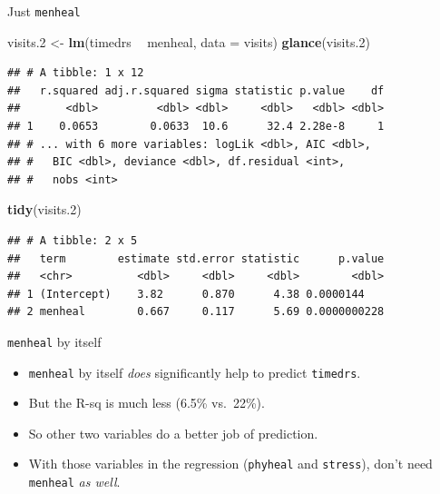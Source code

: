 \documentclass[
  ignorenonframetext,
]{beamer}
\newenvironment{Shaded}{\begin{snugshade}}{\end{snugshade}}
\newcommand{\DataTypeTok}[1]{\textcolor[rgb]{0.13,0.29,0.53}{#1}}
\newcommand{\FloatTok}[1]{\textcolor[rgb]{0.00,0.00,0.81}{#1}}
\newcommand{\KeywordTok}[1]{\textcolor[rgb]{0.13,0.29,0.53}{\textbf{#1}}}
\newcommand{\NormalTok}[1]{#1}
\newcommand{\OperatorTok}[1]{\textcolor[rgb]{0.81,0.36,0.00}{\textbf{#1}}}
\newcommand{\StringTok}[1]{\textcolor[rgb]{0.31,0.60,0.02}{#1}}
\begin{document}
\begin{frame}[fragile]{Just \texttt{menheal}}
\protect\hypertarget{just-menheal}{}

\footnotesize

\begin{Shaded}
\begin{Highlighting}[]
\NormalTok{visits}\FloatTok{.2}\NormalTok{ <-}\StringTok{ }\KeywordTok{lm}\NormalTok{(timedrs }\OperatorTok{~}\StringTok{ }\NormalTok{menheal, }\DataTypeTok{data =}\NormalTok{ visits)}
\KeywordTok{glance}\NormalTok{(visits}\FloatTok{.2}\NormalTok{)}
\end{Highlighting}
\end{Shaded}

\begin{verbatim}
## # A tibble: 1 x 12
##   r.squared adj.r.squared sigma statistic p.value    df
##       <dbl>         <dbl> <dbl>     <dbl>   <dbl> <dbl>
## 1    0.0653        0.0633  10.6      32.4 2.28e-8     1
## # ... with 6 more variables: logLik <dbl>, AIC <dbl>,
## #   BIC <dbl>, deviance <dbl>, df.residual <int>,
## #   nobs <int>
\end{verbatim}

\begin{Shaded}
\begin{Highlighting}[]
\KeywordTok{tidy}\NormalTok{(visits}\FloatTok{.2}\NormalTok{)}
\end{Highlighting}
\end{Shaded}

\begin{verbatim}
## # A tibble: 2 x 5
##   term        estimate std.error statistic      p.value
##   <chr>          <dbl>     <dbl>     <dbl>        <dbl>
## 1 (Intercept)    3.82      0.870      4.38 0.0000144   
## 2 menheal        0.667     0.117      5.69 0.0000000228
\end{verbatim}

\normalsize

\end{frame}

\begin{frame}[fragile]{\texttt{menheal} by itself}
\protect\hypertarget{menheal-by-itself}{}

\begin{itemize}
\item
  \texttt{menheal} by itself \emph{does} significantly help to predict
  \texttt{timedrs}.
\item
  But the R-sq is much less (6.5\% vs.~22\%).
\item
  So other two variables do a better job of prediction.
\item
  With those variables in the regression (\texttt{phyheal} and
  \texttt{stress}), don't need \texttt{menheal} \emph{as well}.
\end{itemize}

\end{frame}
\end{document}
